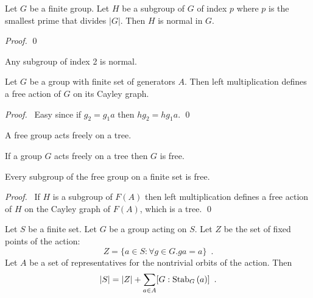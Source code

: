 \begin{cor}
Let $G$ be a finite group. Let $H$ be a subgroup of $G$ of index $p$ where $p$ is the smallest prime that divides $|G|$. Then $H$ is normal in $G$.
\end{cor}

\begin{proof}
\pf
{}
\qed
\end{proof}

\begin{cor}
\label{cor:index-two-normal}
Any subgroup of index 2 is normal.
\end{cor}

\begin{prop}
Let $G$ be a group with finite set of generators $A$. Then left multiplication defines a free action of $G$ on its Cayley graph.
\end{prop}

\begin{proof}
\pf\ Easy since if $g_2 = g_1 a$ then $h g_2 = h g_1 a$. \qed
\end{proof}

\begin{cor}
A free group acts freely on a tree.
\end{cor}

\begin{thm}
If a group $G$ acts freely on a tree then $G$ is free.
\end{thm}


\begin{cor}
Every subgroup of the free group on a finite set is free.
\end{cor}

\begin{proof}
\pf\ If $H$ is a subgroup of $F(A)$ then left multiplication defines a free action of $H$ on the Cayley graph of $F(A)$, which is a tree. \qed
\end{proof}

\begin{prop}
\label{prop:class-formula}
Let $S$ be a finite set. Let $G$ be a group acting on $S$. Let $Z$ be the set of fixed points of the action:
\[ Z = \{a \in S : \forall g \in G. ga = a \} \enspace . \]
Let $A$ be a set of representatives for the nontrivial orbits of the action. Then
\[ |S| = |Z| + \sum_{a \in A} [G : \mathrm{Stab}_{G} \left( {a} \right)] \enspace . \]
\end{prop}

